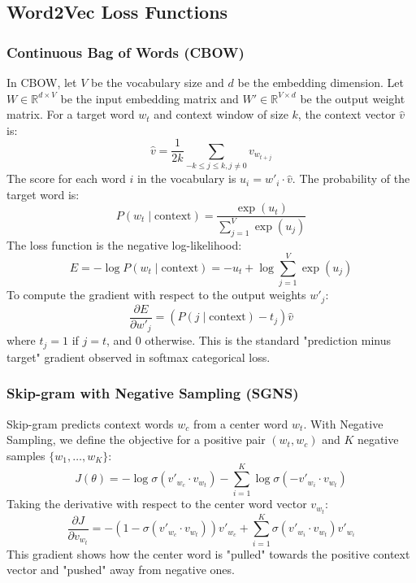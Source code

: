 \documentclass[12pt,a4paper]{article}
\begin{document}
\subsection{Word2Vec Loss Functions}

\subsubsection{Continuous Bag of Words (CBOW)}
In CBOW, let $V$ be the vocabulary size and $d$ be the embedding dimension. Let $W \in \mathbb{R}^{d \times V}$ be the input embedding matrix and $W' \in \mathbb{R}^{V \times d}$ be the output weight matrix. For a target word $w_t$ and context window of size $k$, the context vector $\hat{v}$ is:
\begin{equation}
    \hat{v} = \frac{1}{2k} \sum_{-k \le j \le k, j \ne 0} v_{w_{t+j}}
\end{equation}
The score for each word $i$ in the vocabulary is $u_i = w'_i \cdot \hat{v}$. The probability of the target word is:
\begin{equation}
    P(w_t \mid \text{context}) = \frac{\exp(u_t)}{\sum_{j=1}^V \exp(u_j)}
\end{equation}
The loss function is the negative log-likelihood:
\begin{equation}
    E = -\log P(w_t \mid \text{context}) = -u_t + \log \sum_{j=1}^V \exp(u_j)
\end{equation}
To compute the gradient with respect to the output weights $w'_j$:
\begin{equation}
    \frac{\partial E}{\partial w'_j} = \left( P(j \mid \text{context}) - t_j \right) \hat{v}
\end{equation}
where $t_j = 1$ if $j=t$, and $0$ otherwise. This is the standard "prediction minus target" gradient observed in softmax categorical loss.

\subsubsection{Skip-gram with Negative Sampling (SGNS)}
Skip-gram predicts context words $w_c$ from a center word $w_t$. With Negative Sampling, we define the objective for a positive pair $(w_t, w_c)$ and $K$ negative samples $\{w_1, \dots, w_K\}$:
\begin{equation}
    J(\theta) = -\log \sigma(v'_{w_c} \cdot v_{w_t}) - \sum_{i=1}^K \log \sigma(-v'_{w_i} \cdot v_{w_t})
\end{equation}
Taking the derivative with respect to the center word vector $v_{w_t}$:
\begin{equation}
    \frac{\partial J}{\partial v_{w_t}} = -\left(1 - \sigma(v'_{w_c} \cdot v_{w_t})\right) v'_{w_c} + \sum_{i=1}^K \sigma(v'_{w_i} \cdot v_{w_t}) v'_{w_i}
\end{equation}
This gradient shows how the center word is "pulled" towards the positive context vector and "pushed" away from negative ones.
\end{document}
